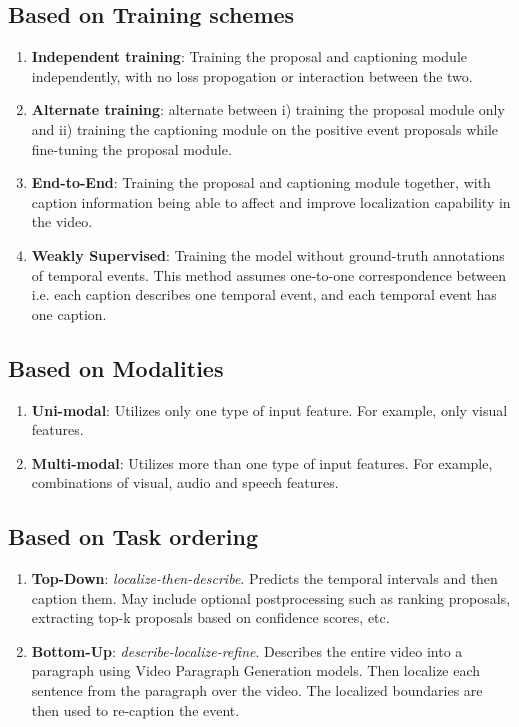 \subsection{Based on Training schemes}
\begin{enumerate}
	\item \textbf{Independent training}: Training the proposal and captioning module independently, with no loss propogation or interaction between the two.
	\item \textbf{Alternate training}: alternate between i) training the proposal module only and ii) training the captioning module on the positive event proposals while fine-tuning the proposal module.
	\item \textbf{End-to-End}: Training the proposal and captioning module together, with caption information being able to affect and improve localization capability in the video.
	\item \textbf{Weakly Supervised}: Training the model without ground-truth annotations of temporal events. This method assumes one-to-one correspondence between i.e. each caption describes one temporal event, and each temporal event has one caption.
\end{enumerate}

\subsection{Based on Modalities}
\begin{enumerate}
	\item \textbf{Uni-modal}: Utilizes only one type of input feature. For example, only visual features.
	\item \textbf{Multi-modal}: Utilizes more than one type of input features. For example, combinations of visual, audio and speech features.
\end{enumerate}

\subsection{Based on Task ordering}
\begin{enumerate}
	\item \textbf{Top-Down}: \textit{localize-then-describe}. Predicts the temporal intervals and then caption them. May include optional postprocessing such as ranking proposals, extracting top-k proposals based on confidence scores, etc.
	\item \textbf{Bottom-Up}: \textit{describe-localize-refine}. Describes the entire video into a paragraph using Video Paragraph Generation models. Then localize each sentence from the paragraph over the video. The localized boundaries are then used to re-caption the event.
\end{enumerate}

